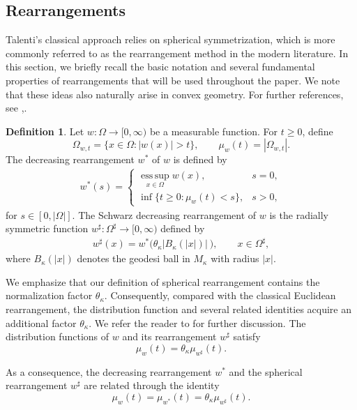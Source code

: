 \documentclass[11pt]{article}
\numberwithin{equation}{section}
\theoremstyle{definition}
\newtheorem{definition}[theorem]{Definition}
\theoremstyle{remark}
\begin{document}
\subsection{Rearrangements}
Talenti's classical approach relies on spherical symmetrization, which is more commonly referred to as the rearrangement method in the modern literature. 
In this section, we briefly recall the basic notation and several fundamental properties of rearrangements that will be used throughout the paper.
We note that these ideas also naturally arise in convex geometry. For further references, see \cite{gruber2007convex},\cite{schneider2013convex}.
\begin{definition}
Let $w:\Omega\to[0,\infty)$ be a measurable function. For $t\ge0$, define
\[
\Omega_{w,t}
=
\{x\in\Omega:|w(x)|>t\},
\qquad
\mu_w(t)
=
|\Omega_{w,t}|.
\]
The decreasing rearrangement $w^*$ of $w$ is defined by
\begin{align}
w^*(s)
=
\begin{cases}
\operatorname*{ess\,sup}_{x\in\Omega}w(x),
& s=0,
\\[0.3em]
\inf\{t\ge0:\mu_w(t)<s\},
& s>0,
\end{cases}
\label{eq:2.2}
\end{align}
for $s\in[0,|\Omega|]$.
The Schwarz decreasing rearrangement of $w$ is the radially symmetric function $w^\sharp:\Omega^\sharp\to[0,\infty)$ defined by
\begin{align}
w^\sharp(x)
=
w^*\bigl(
\theta_\kappa|B_{\kappa}(|x|)|\
\bigr),
\qquad
x\in\Omega^\sharp,
\end{align}
where $B_{\kappa}(|x|)$ denotes the geodesi ball in ${M}_\kappa$ with radius $|x|$. 
\end{definition}
We emphasize that our definition of spherical rearrangement contains the normalization factor $\theta_\kappa$. 
Consequently, compared with the classical Euclidean rearrangement, 
the distribution function and several related identities acquire an additional factor $\theta_\kappa$. 
We refer the reader to \cite{chen2021talenti} for further discussion.
The distribution functions of $w$ and its rearrangement $w^\sharp$ satisfy
\begin{equation}
\mu_w(t)
=
\theta_\kappa \mu_{w^\sharp}(t).
\end{equation}

As a consequence, the decreasing rearrangement $w^*$ and the spherical rearrangement $w^\sharp$ are related through the identity
\[
\mu_w(t)
=
\mu_{w^*}(t)
=
\theta_\kappa \mu_{w^\sharp}(t).
\]
\end{document}

